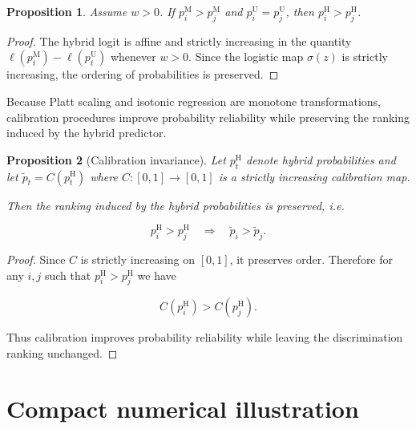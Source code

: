 \documentclass[a4paper,fleqn]{cas-dc}
\newtheorem{proposition}{Proposition}
\begin{document}
\begin{proposition}
	
	Assume $w>0$. If $p_i^{\mathrm{M}}>p_j^{\mathrm{M}}$ and $p_i^{\mathrm{U}}=p_j^{\mathrm{U}}$, then $p_i^{\mathrm{H}}>p_j^{\mathrm{H}}$.
	
\end{proposition}

\begin{proof}
	
	The hybrid logit is affine and strictly increasing in the quantity $\ell(p_t^{\mathrm{M}})-\ell(p_t^{\mathrm{U}})$ whenever $w>0$. Since the logistic map $\sigma(z)$ is strictly increasing, the ordering of probabilities is preserved.
	
\end{proof}

\begin{remark}
	
	Because Platt scaling and isotonic regression are monotone transformations, calibration procedures improve probability reliability while preserving the ranking induced by the hybrid predictor.
	
\end{remark}

\begin{proposition}[Calibration invariance]
	
	Let $p_t^{\mathrm{H}}$ denote hybrid probabilities and let $\tilde p_t = C(p_t^{\mathrm{H}})$ where $C:[0,1]\to[0,1]$ is a strictly increasing calibration map.
	
	Then the ranking induced by the hybrid probabilities is preserved, i.e.
	
	\[
	p_i^{\mathrm{H}} > p_j^{\mathrm{H}}
	\quad\Rightarrow\quad
	\tilde p_i > \tilde p_j .
	\]
	
\end{proposition}

\begin{proof}
	
	Since $C$ is strictly increasing on $[0,1]$, it preserves order. Therefore for any $i,j$ such that $p_i^{\mathrm{H}}>p_j^{\mathrm{H}}$ we have
	
	\[
	C(p_i^{\mathrm{H}}) > C(p_j^{\mathrm{H}}).
	\]
	
	Thus calibration improves probability reliability while leaving the discrimination ranking unchanged.
	
\end{proof}
\section{Compact numerical illustration}
\end{document}
